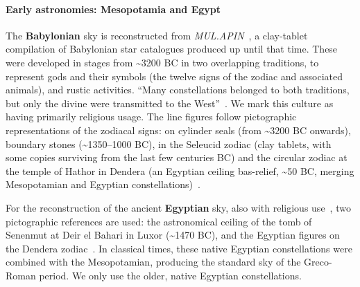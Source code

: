 \documentclass[10pt]{article}
\begin{document}
\paragraph{Early astronomies: Mesopotamia and Egypt} The {\bf Babylonian} sky is reconstructed from \textit{MUL.APIN}~\cite{rogers1998origins1}, a clay-tablet compilation of Babylonian star catalogues produced up until that time. These were developed in stages from \textasciitilde3200 BC in two overlapping traditions, to represent gods and their symbols (the twelve signs of the zodiac and associated animals), and rustic activities. ``Many constellations belonged to both traditions, but only the divine were transmitted to the West''~\cite{rogers1998origins1}. We mark this culture as having primarily religious usage. The line figures follow pictographic representations of the zodiacal signs: on cylinder seals (from \textasciitilde3200 BC onwards), boundary stones (\textasciitilde1350--1000 BC), in the Seleucid zodiac (clay tablets, with some copies surviving from the last few centuries BC) and the circular zodiac at the temple of Hathor in Dendera (an Egyptian ceiling bas-relief, \textasciitilde50 BC, merging  Mesopotamian and Egyptian constellations)~\cite{rogers1998origins1}. 

For the reconstruction of the ancient {\bf Egyptian} sky, also with religious use~\cite{allen2013star}, two pictographic references are used: the astronomical ceiling of the tomb of Senenmut at Deir el Bahari in Luxor (\textasciitilde1470 BC), and the Egyptian figures on the Dendera zodiac~\cite{lull2009constellations}. In classical times, these native Egyptian constellations were combined with the Mesopotamian, producing the standard sky of the Greco-Roman period. We only use the older, native Egyptian constellations.
\end{document}
